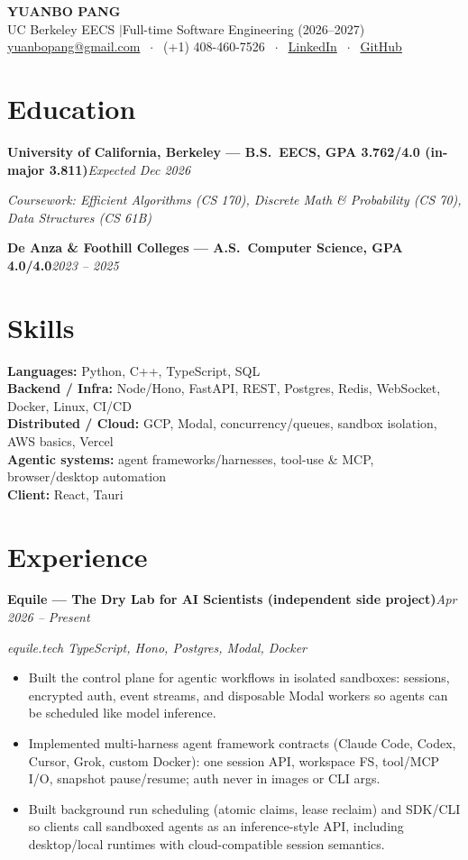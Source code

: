 \documentclass[10pt, letterpaper]{article}
\newcommand{\role}[2]{%
  \vspace{5pt}%
  \noindent\textbf{#1}\hfill\textit{#2}\par
}
\newcommand{\rolesub}[1]{%
  \noindent\textit{#1}\par\vspace{1pt}%
}
\begin{document}
\begin{center}
  {\LARGE\bfseries YUANBO PANG}\\[4pt]
  {\large UC Berkeley EECS \quad$\vert$\quad Full-time Software Engineering (2026--2027)}\\[4pt]
  \href{mailto:yuanbopang@gmail.com}{yuanbopang@gmail.com}
  $\;\cdot\;$ (+1) 408-460-7526
  $\;\cdot\;$ \href{https://www.linkedin.com/in/yuanbopang/}{LinkedIn}
  $\;\cdot\;$ \href{https://github.com/yuanboP}{GitHub}
\end{center}

\section{Education}
\role{University of California, Berkeley --- B.S.\ EECS, GPA 3.762/4.0 (in-major 3.811)}{Expected Dec 2026}
\rolesub{Coursework: Efficient Algorithms (CS 170), Discrete Math \& Probability (CS 70), Data Structures (CS 61B)}
\role{De Anza \& Foothill Colleges --- A.S.\ Computer Science, GPA 4.0/4.0}{2023 -- 2025}

\section{Skills}
\textbf{Languages:} Python, C++, TypeScript, SQL\\[1pt]
\textbf{Backend / Infra:} Node/Hono, FastAPI, REST, Postgres, Redis, WebSocket, Docker, Linux, CI/CD\\[1pt]
\textbf{Distributed / Cloud:} GCP, Modal, concurrency/queues, sandbox isolation, AWS basics, Vercel\\[1pt]
\textbf{Agentic systems:} agent frameworks/harnesses, tool-use \& MCP, browser/desktop automation\\[1pt]
\textbf{Client:} React, Tauri

\section{Experience}

\role{Equile --- The Dry Lab for AI Scientists (independent side project)}{Apr 2026 -- Present}
\rolesub{equile.tech \quad TypeScript, Hono, Postgres, Modal, Docker}
\begin{itemize}
  \item Built the control plane for agentic workflows in isolated sandboxes: sessions, encrypted auth, event streams, and disposable Modal workers so agents can be scheduled like model inference.
  \item Implemented multi-harness agent framework contracts (Claude Code, Codex, Cursor, Grok, custom Docker): one session API, workspace FS, tool/MCP I/O, snapshot pause/resume; auth never in images or CLI args.
  \item Built background run scheduling (atomic claims, lease reclaim) and SDK/CLI so clients call sandboxed agents as an inference-style API, including desktop/local runtimes with cloud-compatible session semantics.
\end{itemize}
\end{document}

